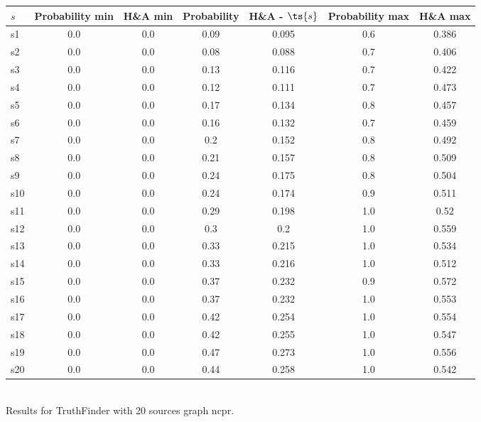 \documentclass{article}
\begin{document}
\noindent\begin{tabular}{|l|c|c|c|c|c|c|}
\hline
$s$& Probability min & H\&A min & Probability & H\&A - $\ts{s}$ & Probability max & H\&A max\\
\hline
s1 &0.0 & 0.0 & 0.09 & 0.095 & 0.6 & 0.386\\
\hline
s2 &0.0 & 0.0 & 0.08 & 0.088 & 0.7 & 0.406\\
\hline
s3 &0.0 & 0.0 & 0.13 & 0.116 & 0.7 & 0.422\\
\hline
s4 &0.0 & 0.0 & 0.12 & 0.111 & 0.7 & 0.473\\
\hline
s5 &0.0 & 0.0 & 0.17 & 0.134 & 0.8 & 0.457\\
\hline
s6 &0.0 & 0.0 & 0.16 & 0.132 & 0.7 & 0.459\\
\hline
s7 &0.0 & 0.0 & 0.2 & 0.152 & 0.8 & 0.492\\
\hline
s8 &0.0 & 0.0 & 0.21 & 0.157 & 0.8 & 0.509\\
\hline
s9 &0.0 & 0.0 & 0.24 & 0.175 & 0.8 & 0.504\\
\hline
s10 &0.0 & 0.0 & 0.24 & 0.174 & 0.9 & 0.511\\
\hline
s11 &0.0 & 0.0 & 0.29 & 0.198 & 1.0 & 0.52\\
\hline
s12 &0.0 & 0.0 & 0.3 & 0.2 & 1.0 & 0.559\\
\hline
s13 &0.0 & 0.0 & 0.33 & 0.215 & 1.0 & 0.534\\
\hline
s14 &0.0 & 0.0 & 0.33 & 0.216 & 1.0 & 0.512\\
\hline
s15 &0.0 & 0.0 & 0.37 & 0.232 & 0.9 & 0.572\\
\hline
s16 &0.0 & 0.0 & 0.37 & 0.232 & 1.0 & 0.553\\
\hline
s17 &0.0 & 0.0 & 0.42 & 0.254 & 1.0 & 0.554\\
\hline
s18 &0.0 & 0.0 & 0.42 & 0.255 & 1.0 & 0.547\\
\hline
s19 &0.0 & 0.0 & 0.47 & 0.273 & 1.0 & 0.556\\
\hline
s20 &0.0 & 0.0 & 0.44 & 0.258 & 1.0 & 0.542\\
\hline
\end{tabular}\\

\noindent Results for TruthFinder with 20 sources graph ncpr.
\end{document}
